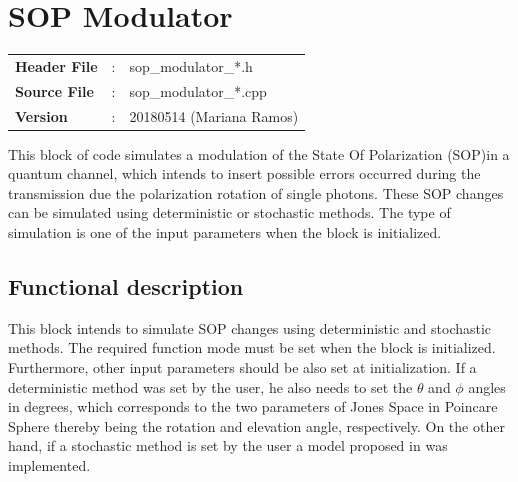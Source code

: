 \clearpage

\section{SOP Modulator}
\label{sec:sop}
\begin{refsection}

\begin{tcolorbox}	
\begin{tabular}{p{2.75cm} p{0.2cm} p{10.5cm}} 	
\textbf{Header File}    &:& sop\_modulator\_*.h \\
\textbf{Source File}    &:& sop\_modulator\_*.cpp \\
\textbf{Version}        &:& 20180514 (Mariana Ramos)
\end{tabular}
\end{tcolorbox}

This block of code simulates a modulation of the State Of Polarization (SOP)in a quantum channel, which intends to insert possible errors occurred during the transmission due the polarization rotation of single photons. These SOP changes can be simulated using deterministic or stochastic methods. The type of simulation is one of the input parameters when the block is initialized.


\subsection*{Functional description}

This block intends to simulate SOP changes using deterministic and stochastic methods. The required function mode must be set when the block is initialized. Furthermore, other input parameters should be also set at initialization. If a deterministic method was set by the user, he also needs to set the $\theta$ and $\phi$ angles in degrees, which corresponds to the two parameters of Jones Space in Poincare Sphere thereby being the rotation and elevation angle, respectively. On the other hand, if a stochastic method is set by the user a model proposed in \cite{Czegledi16} was implemented.


\end{refsection}
